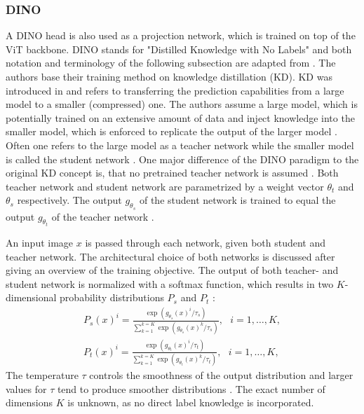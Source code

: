 \subsubsection{DINO}
A DINO \citep{Caron2021} head is also used as a projection network, which is trained on top of the ViT backbone.
DINO stands for "Distilled Knowledge with No Labels" and both notation and terminology of the following subsection are adapted from \citep{Caron2021}.
The authors base their training method on knowledge distillation (KD).
KD was introduced in \citep{Hinton2015} and refers to transferring the prediction capabilities from a large model to a smaller (compressed) one.
The authors assume a large model, which is potentially trained on an extensive amount of data and inject knowledge into the smaller model, which is enforced to replicate the output of the larger model \citep{Hinton2015,Caron2021}.
Often one refers to the large model as a teacher network while the smaller model is called the student network \citep{Caron2021}. 
One major difference of the DINO paradigm to the original KD concept is, that no pretrained teacher network is assumed \citep{Caron2021}.
Both teacher network and student network are parametrized by a weight vector $\theta_t$ and $\theta_s$ respectively.
The output $g_{\theta_s}$ of the student network is trained to equal the output $g_{\theta_t}$ of the teacher network \citep{Caron2021}.
\par
An input image $x$ is passed through each network, given both student and teacher network.
The architectural choice of both networks is discussed after giving an overview of the training objective.
The output of both teacher- and student network is normalized with a softmax function, which results in two $K$-dimensional probability distributions $P_s$ and $P_t$ \citep{Caron2021}:
\begin{align}
	P_{s}(x)^i = \frac{\exp(g_{\theta_{s}}(x)^i/\tau_{s})}{\sum_{k=1}^{k=K}\exp(g_{\theta_{s}}(x)^k/\tau_{s})}, \hspace{8pt} i=1,\dots,K, \\
	P_{t}(x)^i = \frac{\exp(g_{\theta_{t}}(x)^i/\tau_{t})}{\sum_{k=1}^{k=K}\exp(g_{\theta_{t}}(x)^k/\tau_{t})}, \hspace{8pt} i=1,\dots,K,
	\label{equation:dino-softmax}
\end{align}
The temperature $\tau$ controls the smoothness of the output distribution \citep{Caron2021} and larger values for $\tau$ tend to produce smoother distributions \citep{Hinton2015}.
The exact number of dimensions $K$ is unknown, as no direct label knowledge is incorporated.
